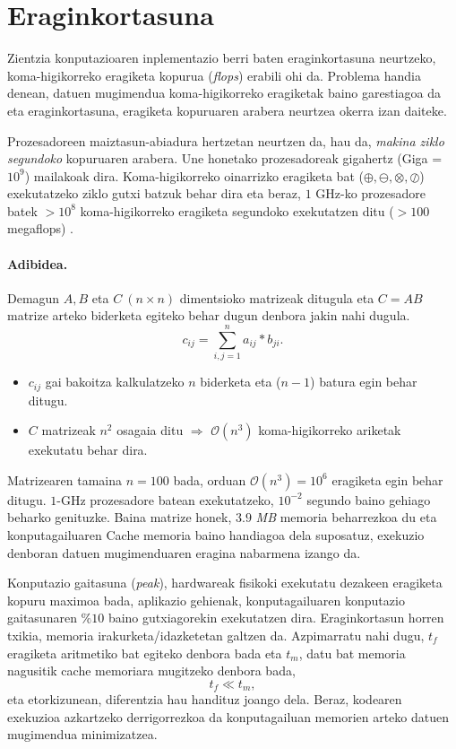 \section{Eraginkortasuna}

Zientzia konputazioaren inplementazio berri baten eraginkortasuna neurtzeko, koma-higikorreko eragiketa kopurua (\emph{flops}) erabili ohi da. Problema handia denean, datuen mugimendua koma-higikorreko eragiketak baino garestiagoa da eta eraginkortasuna, eragiketa kopuruaren arabera neurtzea okerra izan daiteke. 

Prozesadoreen maiztasun-abiadura hertzetan neurtzen da, hau da,  \emph{makina ziklo segundoko} kopuruaren arabera. Une honetako prozesadoreak gigahertz (Giga = $10^9$) mailakoak dira. Koma-higikorreko oinarrizko eragiketa bat ($\oplus,\ominus,\otimes,\oslash$) exekutatzeko  ziklo gutxi batzuk behar dira eta beraz, $1$ GHz-ko prozesadore batek
$>10^8$ koma-higikorreko eragiketa segundoko exekutatzen ditu ($>100$ megaflops) \cite{Pacheco2011}.

\paragraph*{\textbf{Adibidea}.} 
Demagun $A,B$ eta $C \ (n \times n)$ dimentsioko matrizeak ditugula eta $C=AB$ matrize arteko biderketa egiteko behar dugun denbora jakin nahi dugula.
\begin{equation*}
c_{ij}=\sum\limits_{i,j=1}^{n} a_{ij}*b_{ji}.
\end{equation*}

\begin{itemize}
\item $c_{ij}$ gai bakoitza kalkulatzeko $n$ biderketa eta ($n-1$) batura egin behar ditugu.
\item $C$ matrizeak $n^2$ osagaia ditu $\Rightarrow$ $\mathcal{O}(n^3)$ koma-higikorreko ariketak exekutatu behar dira.
\end{itemize}

Matrizearen tamaina $n=100$ bada,  orduan  $\mathcal{O}(n^3)=10^{6}$ eragiketa egin behar ditugu. $1$-GHz prozesadore batean exekutatzeko, $10^{-2}$ segundo baino gehiago beharko genituzke. Baina matrize honek,  $3.9$ \emph{MB} memoria beharrezkoa du eta  konputagailuaren Cache memoria baino handiagoa dela suposatuz, exekuzio denboran datuen mugimenduaren eragina nabarmena izango da. 

Konputazio gaitasuna (\emph{peak}), hardwareak fisikoki exekutatu dezakeen eragiketa kopuru maximoa bada, aplikazio gehienak, konputagailuaren konputazio gaitasunaren  $\%10$ baino gutxiagorekin exekutatzen dira.  Eraginkortasun horren txikia, memoria irakurketa/idazketetan galtzen da. Azpimarratu nahi dugu, $t_f$ eragiketa aritmetiko bat egiteko denbora bada eta $t_m$, datu bat memoria nagusitik cache memoriara mugitzeko denbora bada,
\begin{equation*}
 t_f \ll t_m,
\end{equation*}
eta etorkizunean, diferentzia hau handituz joango dela. Beraz, kodearen exekuzioa azkartzeko derrigorrezkoa da konputagailuan memorien arteko datuen mugimendua minimizatzea.
       
